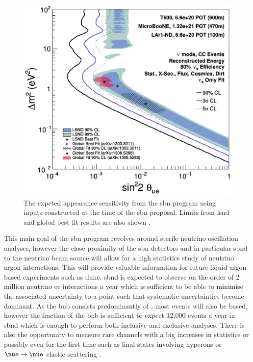 \begin{figure}[h!]
    \centering
    \includegraphics[width = \largefigwidth]{figures-chap3/SBN_proposal_sensitivity.png}
    \caption[\nue appearance \gls{sbn} proposal sensitivity.]{The expcted \nue appearance sensitivity from the \gls{sbn} program using inputs constructed at the time of the \gls{sbn} proposal. Limits from \gls{lsnd} and global best fit results are also shown \cite{SBN_Proposal}.}
    \label{fig:SBN_proposal_sensitivity}
\end{figure}

\newpage
This main goal of the \gls{sbn} program revolves around sterile neutrino oscillation analyses, however the close proximity of the \gls{sbn} detectors and in particular \gls{sbnd} to the neutrino beam source will allow for a high statistics study of neutrino argon interactions. This will provide valuable information for future liquid argon based experiments such as \gls{dune}. \gls{sbnd} is expected to observe on the order of 2 million neutrino \gls{cc} interactions a year which is sufficient to be able to minimise the associated uncertainty to a point such that systematic uncertainties become dominant. As the \gls{bnb} consists predominantly of \numu, most events will also be \numu based, however the \nue fraction of the \gls{bnb} is sufficient to expect 12,000 \nue events a year in \gls{sbnd} which is enough to perform both inclusive and exclusive analyses. There is also the opportunity to measure rare channels with a big increases in statistics or possibly even for the first time such as final states involving hyperons or $\nue \rightarrow \nue$ elastic scattering \cite{SBN_paper} \cite{light_dark_matter}.

